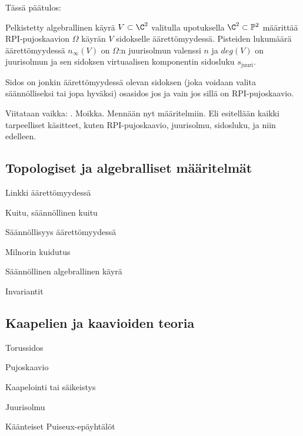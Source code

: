 Tässä päätulos:
\begin{lause}
    Pelkistetty algebrallinen käyrä $V\subset\C^2$ valitulla upotuksella $\C^2\subset\mathbb{P}^2$ määrittää RPI-pujoskaavion $\Omega$ käyrän $V$ sidokselle äärettömyydessä. Pisteiden lukumäärä äärettömyydessä $n_\infty(V)$ on $\Omega$:n juurisolmun valenssi $n$ ja $deg(V)$ on juurisolmun ja sen sidoksen virtuaalisen komponentin sidosluku $s_\text{juuri}$.
\end{lause}
\begin{lause}
    Sidos on jonkin äärettömyydessä olevan sidoksen (joka voidaan valita säännölliseksi tai jopa hyväksi) osasidos jos ja vain jos sillä on RPI-pujoskaavio.
\end{lause}


Viitataan vaikka: \citep{Neumann1989}. Moikka. Mennään nyt määritelmiin. Eli esitellään kaikki tarpeelliset käsitteet, kuten RPI-pujoskaavio, juurisolmu, sidosluku, ja niin edelleen.
\subsection{Topologiset ja algebralliset määritelmät}
\begin{maaritelma}
    Linkki äärettömyydessä
\end{maaritelma}
\begin{maaritelma}
    Kuitu, säännöllinen kuitu
\end{maaritelma}
\begin{maaritelma}
    Säännöllisyys äärettömyydessä
\end{maaritelma}
\begin{maaritelma}
    Milnorin kuidutus
\end{maaritelma}
\begin{maaritelma}
    Säännöllinen algebrallinen käyrä
\end{maaritelma}
\begin{propositio}
    Invariantit
\end{propositio}
\subsection{Kaapelien ja kaavioiden teoria}
\begin{maaritelma}
    Torussidos
\end{maaritelma}
\begin{maaritelma}
    Pujoskaavio
\end{maaritelma}
\begin{maaritelma}
    Kaapelointi tai säikeistys
\end{maaritelma}
\begin{maaritelma}
    Juurisolmu
\end{maaritelma}
\begin{lause}
    Käänteiset Puiseux-epäyhtälöt
\end{lause}